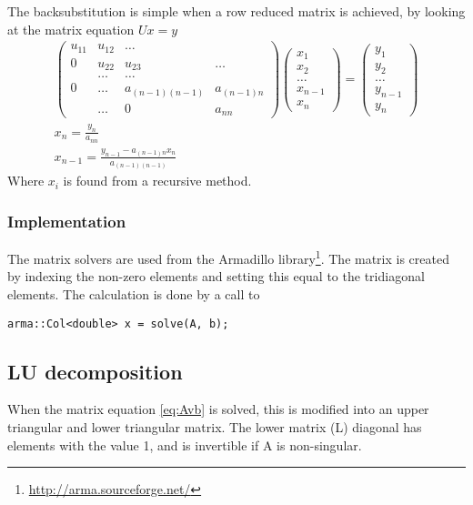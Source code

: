 \documentclass[11pt,a4paper,english,final]{article}
\numberwithin{equation}{section}
\begin{document}
The backsubstitution is simple when a row reduced matrix is achieved,
by looking at the matrix equation $Ux = y$
\begin{gather}
\begin{pmatrix} u_{11} & u_{12} & \dots\\
                0 & u_{22} & u_{23} & \dots\\
                &\dots & \dots\\
                0 & \dots & a_{(n-1)(n-1)} & a_{(n-1)n} \\
                & \dots & 0 & a_{nn}
\end{pmatrix} \begin{pmatrix} x_1 \\ x_2 \\ \dots \\ x_{n-1}\\ x_n \end{pmatrix}
 = \begin{pmatrix} y_1 \\ y_2 \\ \dots\\ y_{n-1} \\ y_n \end{pmatrix}\\
 x_n = \frac{y_n}{a_{nn}}\\
 x_{n-1} = \frac{y_{n-1} - a_{(n-1)n}x_n}{a_{(n-1)(n-1)}}
\end{gather}
Where $x_{i}$ is found from a recursive method.

\subsubsection{Implementation}

The matrix solvers are used from the Armadillo 
library\footnote{\url{http://arma.sourceforge.net/}}. The matrix is
created by indexing the non-zero elements and setting this equal to the 
tridiagonal elements. The calculation is done by a call to 
\begin{lstlisting}
arma::Col<double> x = solve(A, b);
\end{lstlisting}


\subsection{LU decomposition}

When the matrix equation \eqref{eq:Avb} is solved, this is modified into
an upper triangular and lower triangular matrix. The lower matrix (L) 
diagonal has elements with the value 1, and is invertible if A is 
non-singular.
\end{document}
